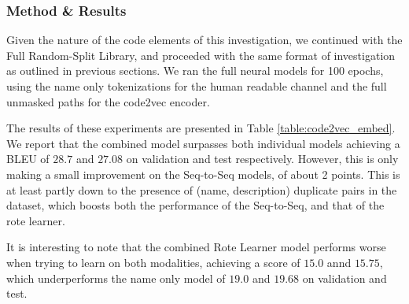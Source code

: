 \subsubsection{Method \& Results} %

Given the nature of the code elements of this investigation, we continued with the Full Random-Split Library, and proceeded with the same format of investigation as outlined in previous sections. 
We ran the full neural models for 100 epochs, using the name only tokenizations for the human readable channel and the full unmasked paths for the code2vec encoder.

The results of these experiments are presented in Table \ref{table:code2vec_embed}. 
We report that the combined model surpasses both individual models achieving a BLEU of $28.7$ and $27.08$ on validation and test respectively. 
However, this is only making a small improvement on the Seq-to-Seq models, of about 2 points. 
This is at least partly down to the presence of (name, description) duplicate pairs in the dataset, which boosts both the performance of the Seq-to-Seq, and that of the rote learner.

It is interesting to note that the combined Rote Learner model performs worse when trying to learn on both modalities, achieving a score of $15.0$ annd $15.75$, which underperforms the name only model of $19.0$ and $19.68$ on validation and test.  


